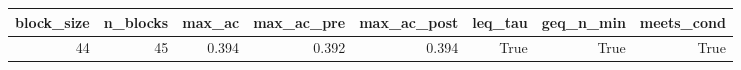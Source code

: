 \begin{tabular}{rrrrrrrr}
\toprule
block\_size & n\_blocks & max\_ac & max\_ac\_pre & max\_ac\_post & leq\_tau & geq\_n\_min & meets\_cond \\
\midrule
44 & 45 & 0.394 & 0.392 & 0.394 & True & True & True \\
\bottomrule
\end{tabular}
